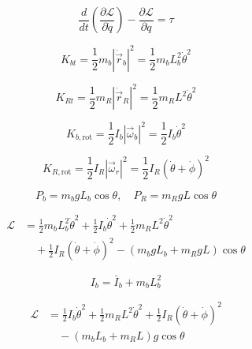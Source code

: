 \documentclass[conference]{IEEEtran}
\begin{document}
\begin{equation}
\frac{d}{dt}\left(\frac{\partial \mathcal{L}}{\partial \dot{q}}\right) - \frac{\partial \mathcal{L}}{\partial q} = \tau
\end{equation}

\begin{equation}
K_{bt} = \frac{1}{2} m_b |\dot{\vec{r}}_b|^2 = \frac{1}{2} m_b L_b^2 \dot{\theta}^2
\end{equation}

\begin{equation}
K_{Rt} = \frac{1}{2} m_R |\dot{\vec{r}}_R|^2 = \frac{1}{2} m_R L^2 \dot{\theta}^2
\end{equation}

\begin{equation}
K_{b,\text{rot}} = \frac{1}{2} I_b |\vec{\omega}_b|^2 = \frac{1}{2} I_b \dot{\theta}^2
\end{equation}

\begin{equation}
K_{R,\text{rot}} = \frac{1}{2} I_R |\vec{\omega}_r|^2 = \frac{1}{2} I_R (\dot{\theta} + \dot{\phi})^2
\end{equation}

\begin{equation}
P_b = m_b g L_b \cos\theta, \quad P_R = m_R g L \cos\theta
\end{equation}

\begin{equation}
\begin{aligned}
\mathcal{L} &= \frac{1}{2} m_b L_b^2 \dot{\theta}^2 + \frac{1}{2} I_b \dot{\theta}^2 + \frac{1}{2} m_R L^2 \dot{\theta}^2 \\
&\quad + \frac{1}{2} I_R (\dot{\theta} + \dot{\phi})^2 - (m_b g L_b + m_R g L)\cos\theta
\end{aligned}
\end{equation}

\begin{equation}
I_b = \bar{I}_b + m_b L_b^2
\end{equation}

\begin{equation}
\begin{aligned}
\mathcal{L} &= \frac{1}{2} I_b \dot{\theta}^2 + \frac{1}{2} m_R L^2 \dot{\theta}^2 + \frac{1}{2} I_R (\dot{\theta} + \dot{\phi})^2 \\
&\quad - (m_b L_b + m_R L) g \cos\theta
\end{aligned}
\end{equation}
\end{document}
